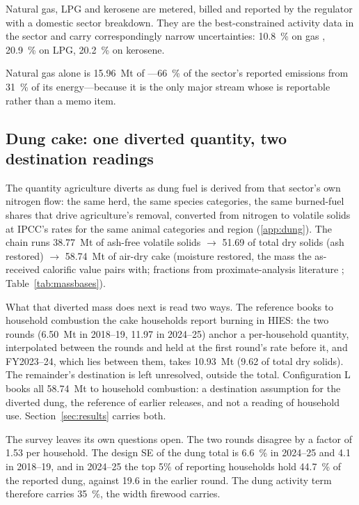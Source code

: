 Natural gas, LPG and kerosene are metered, billed and reported by the regulator with a domestic
sector breakdown. They are the best-constrained activity data in the sector and carry
correspondingly narrow uncertainties: \SI{10.8}{\percent} on gas \COtwo{},
\SI{20.9}{\percent} on LPG, \SI{20.2}{\percent} on kerosene.

Natural gas alone is \SI{15.96}{\mega\tonne} of \COtwo{}---\SI{66}{\percent} of the sector's
reported emissions from \SI{31}{\percent} of its energy---because it is the only major stream
whose \COtwo{} is reportable rather than a memo item.

\subsection{Dung cake: one diverted quantity, two destination readings}

The quantity agriculture diverts as dung fuel is derived from that sector's own nitrogen
flow: the same herd, the same species categories, the same burned-fuel shares that drive
agriculture's removal, converted from nitrogen to volatile solids at IPCC's rates for
the same animal categories and region (\ref{app:dung}). The chain runs
\SI{38.77}{\mega\tonne} of ash-free volatile solids $\rightarrow$ \SI{51.69}{} of
total dry solids (ash restored) $\rightarrow$ \SI{58.74}{\mega\tonne} of air-dry cake
(moisture restored, the mass the as-received calorific value pairs with; fractions from
proximate-analysis literature \citep{szymajda2019}; Table~\ref{tab:massbases}).

What that diverted mass does next is read two ways. The reference books to household
combustion the cake households report burning in HIES: the two rounds
(\SI{6.50}{\mega\tonne} in 2018--19, \SI{11.97}{} in 2024--25) anchor a per-household
quantity, interpolated between the rounds and held at the first round's rate before it,
and FY2023--24, which lies between them, takes \SI{10.93}{\mega\tonne}
(\SI{9.62}{} of total dry solids). The remainder's destination is left unresolved,
outside the total. Configuration L books all \SI{58.74}{\mega\tonne} to household
combustion: a destination assumption for the diverted dung, the reference of earlier
releases, and not a reading of household use. Section~\ref{sec:results} carries both.

The survey leaves its own questions open. The two rounds disagree by a factor of
\num{1.53} per household. The design SE of the dung total is \SI{6.6}{\percent} in
2024--25 and \SI{4.1}{} in 2018--19, and in 2024--25 the top 5\% of reporting
households hold \SI{44.7}{\percent} of the reported dung, against \SI{19.6}{} in
the earlier round. The dung activity term therefore carries \SI{35}{\percent}, the
width firewood carries.

